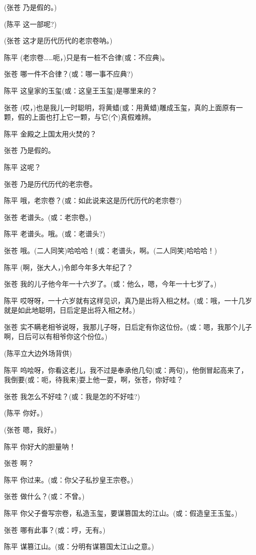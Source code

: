 (张苍 乃是假的。)

(陈平 这一部呢?)

(张苍 这才是历代历代的老宗卷呐。)

陈平 (老宗卷\ldots{}\ldots{}呃，)只是有一桩不合律(或：不应典)。

张苍 哪一件不合律？(或：哪一事不应典?)

陈平 这皇家的玉玺(或：这皇王玉玺)是哪里来的？

张苍
(哎，)也是我儿一时聪明，将黄蜡(或：用黄蜡)雕成玉玺，真的上面原有一颗，假的上面也打上它一颗，与它(个)真假难辨。

陈平 金殿之上国太用火焚的？

张苍 乃是假的。

陈平 这呢？

张苍 乃是历代历代的老宗卷。

陈平 哦，老宗卷？(或：如此说来这是历代历代的老宗卷?)

张苍 老谱头。(或：老宗卷。)

陈平 老谱头。哦。(或：老谱头?)

张苍 哦。(二人同笑)哈哈哈！(或：老谱头，啊。(二人同笑)哈哈哈！)

陈平 (啊，张大人，)令郎今年多大年纪了？

张苍 我的儿子他今年一十六岁了。(或：他么，嗯，今年一十七岁了。)

陈平
哎呀呀，一十六岁就有这样见识，真乃是出将入相之材。(或：哦，一十几岁就是如此地聪明，日后定是出将入相之材。)

张苍
实不瞒老相爷说呀，我那儿子呀，日后定有你这位份。(或：嗯，我那个儿子啊，日后可以有相爷你这个份位。)

(陈平立大边外场背供)

陈平
呜哙呀，你看这老儿，我不过是奉承他几句(或：两句)，他倒冒起高来了，我倒要(或：呃，待我来)耍上他一耍，啊，张苍，你好哇？

张苍 我怎么不好哇？(或：我是怎的不好哇?)

(陈平 你好。)

(张苍 嗯，我好。)

陈平 你好大的胆量呐！

张苍 啊？

陈平 你过来。(或：你父子私抄皇王宗卷。)

张苍 做什么？(或：不曾。)

陈平 你父子誊写宗卷，私造玉玺，要谋篡国太的江山。(或：假造皇王玉玺。)

张苍 哪有此事？(或：哼，无有。)

陈平 谋篡江山。(或：分明有谋篡国太江山之意。)

